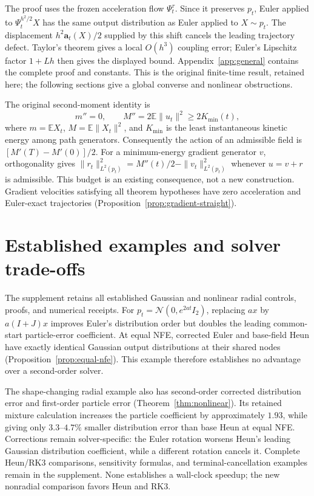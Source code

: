\documentclass[journal,10pt,romanappendices]{IEEEtran}
\theoremstyle{definition}
\newcommand{\E}{\mathbb E}
\newcommand{\acc}{\mathbf a}
\begin{document}
The proof uses the frozen acceleration flow $\Psi_t^\tau$. Since it preserves $p_t$, Euler applied to $\Psi_t^{h^2/2}X$ has the same output distribution as Euler applied to $X\sim p_t$. The displacement $h^2\acc_t(X)/2$ supplied by this shift cancels the leading trajectory defect. Taylor's theorem gives a local $O(h^3)$ coupling error; Euler's Lipschitz factor $1+Lh$ then gives the displayed bound. Appendix~\ref{app:general} contains the complete proof and constants. This is the original finite-time result, retained here; the following sections give a global converse and nonlinear obstructions.

The original second-moment identity is
\begin{equation}
 m''=0,\qquad M''=2\E\|u_t\|^2\ge2K_{\min}(t),
 \label{eq:revision-moment}
\end{equation}
where $m=\E X_t$, $M=\E\|X_t\|^2$, and $K_{\min}$ is the least instantaneous kinetic energy among path generators. Consequently the action of an admissible field is $[M'(T)-M'(0)]/2$. For a minimum-energy gradient generator $v$, orthogonality gives
$\|r_t\|_{L^2(p_t)}^2=M''(t)/2-\|v_t\|_{L^2(p_t)}^2$ whenever $u=v+r$ is admissible. This budget is an existing consequence, not a new construction. Gradient velocities satisfying all theorem hypotheses have zero acceleration and Euler-exact trajectories (Proposition~\ref{prop:gradient-straight}).








\section{Established examples and solver trade-offs}
\label{sec:established-comparison}

The supplement retains all established Gaussian and nonlinear radial controls, proofs, and numerical receipts. For $p_t=\mathcal N(0,e^{2at}I_2)$, replacing $ax$ by $a(I+J)x$ improves Euler's distribution order but doubles the leading common-start particle-error coefficient. At equal NFE, corrected Euler and base-field Heun have exactly identical Gaussian output distributions at their shared nodes (Proposition~\ref{prop:equal-nfe}). This example therefore establishes no advantage over a second-order solver.

The shape-changing radial example also has second-order corrected distribution error and first-order particle error (Theorem~\ref{thm:nonlinear}). Its retained mixture calculation increases the particle coefficient by approximately $1.93$, while giving only $3.3$--$4.7\%$ smaller distribution error than base Heun at equal NFE. Corrections remain solver-specific: the Euler rotation worsens Heun's leading Gaussian distribution coefficient, while a different rotation cancels it. Complete Heun/RK3 comparisons, sensitivity formulas, and terminal-cancellation examples remain in the supplement. None establishes a wall-clock speedup; the new nonradial comparison favors Heun and RK3.
\end{document}
